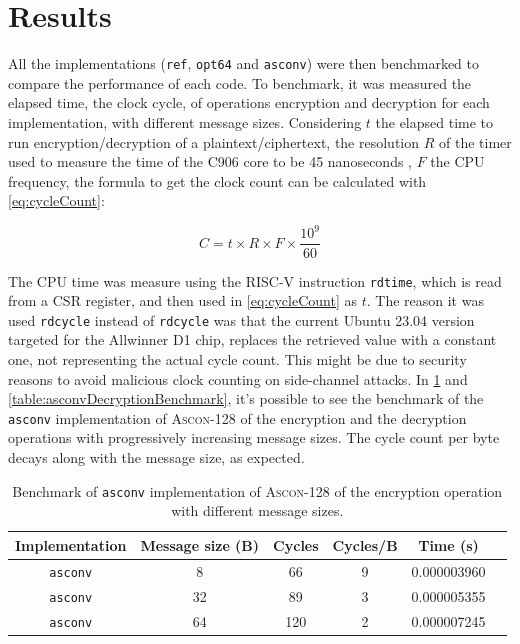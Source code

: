 \documentclass[11pt,twoside]{article}
\begin{document}
\section{Results}
\label{section:results}

All the implementations (\texttt{ref}, \texttt{opt64} and \texttt{asconv}) were then benchmarked to compare the performance of each code. To benchmark, it was measured the elapsed time, the clock cycle, of operations encryption and decryption for each implementation, with different message sizes. Considering $t$ the elapsed time to run encryption/decryption of a plaintext/ciphertext, the resolution $R$ of the timer used to measure the time of the C906 core to be 45 nanoseconds  \cite{10179399}, $F$ the CPU frequency, the formula to get the clock count can be calculated with \cref{eq:cycleCount}:

\begin{equation}
  C = t \times R \times F \times \frac{10^{9}}{60} \label{eq:cycleCount}
\end{equation}

The CPU time was measure using the RISC-V instruction \texttt{rdtime}, which is read from a CSR register, and then used in \cref{eq:cycleCount} as $t$. The reason it was used \texttt{rdcycle} instead of \texttt{rdcycle} was that the current Ubuntu 23.04 version targeted for the Allwinner D1 chip, replaces the retrieved value with a constant one, not representing the actual cycle count. This might be due to security reasons to avoid malicious clock counting on side-channel attacks. In \cref{table:asconvEncryptionBenchmark} and \cref{table:asconvDecryptionBenchmark}, it's possible to see the benchmark of the \texttt{asconv} implementation of \textsc{Ascon-128} of the encryption and the decryption operations with progressively increasing message sizes. The cycle count per byte decays along with the message size, as expected.

\begin{table}[h]
  \centering
  \begin{tabular}{|c|c|c|c|c|c|}
    \hline
    \textbf{Implementation} & \textbf{Message size (B)} &
    \textbf{Cycles}         & \textbf{Cycles/B}         & \textbf{Time (s)}                   \\ \hline

    \texttt{asconv}         & 8                         & 66                & 9 & 0.000003960 \\ \hline

    \texttt{asconv}         & 32                        & 89                & 3 & 0.000005355 \\ \hline

    \texttt{asconv}         & 64                        & 120               & 2 & 0.000007245 \\ \hline
  \end{tabular}
  \caption{Benchmark of \texttt{asconv} implementation of \textsc{Ascon-128} of the encryption operation with different message sizes.}
  \label{table:asconvEncryptionBenchmark}
\end{table}
\end{document}
